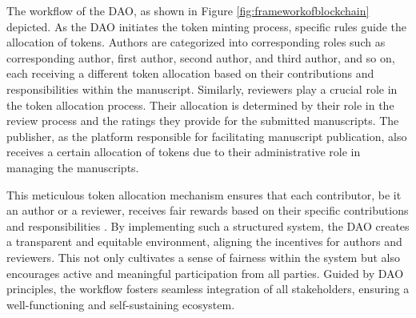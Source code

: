 \documentclass[lettersize,journal]{IEEEtran}
\begin{document}
The workflow of the DAO, as shown in Figure \ref{fig:frameworkofblockchain} depicted. As the DAO initiates the token minting process, specific rules guide the allocation of tokens. Authors are categorized into corresponding roles such as corresponding author, first author, second author, and third author, and so on, each receiving a different token allocation based on their contributions and responsibilities within the manuscript. Similarly, reviewers play a crucial role in the token allocation process. Their allocation is determined by their role in the review process and the ratings they provide for the submitted manuscripts. The publisher, as the platform responsible for facilitating manuscript publication, also receives a certain allocation of tokens due to their administrative role in managing the manuscripts.

This meticulous token allocation mechanism ensures that each contributor, be it an author or a reviewer, receives fair rewards based on their specific contributions and responsibilities \cite{10123021}. By implementing such a structured system, the DAO creates a transparent and equitable environment, aligning the incentives for authors and reviewers. This not only cultivates a sense of fairness within the system but also encourages active and meaningful participation from all parties. Guided by DAO principles, the workflow fosters seamless integration of all stakeholders, ensuring a well-functioning and self-sustaining ecosystem.
\end{document}
